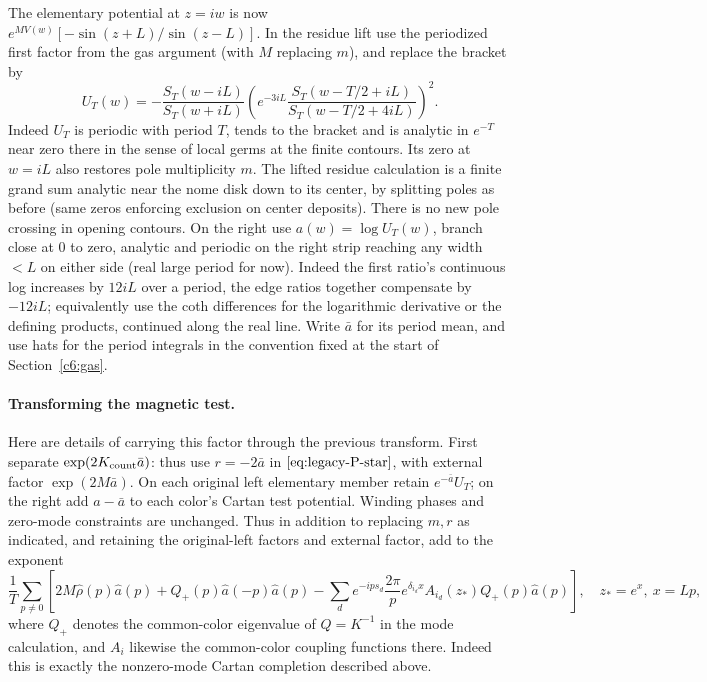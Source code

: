The elementary potential at \(z=iw\) is now \(e^{M V(w)} [-\sin(z+L)/\sin(z-L)]\). In the residue lift use the periodized first factor from the gas argument (with \(M\) replacing \(m\)), and replace the bracket by
\[
 U_T(w)=-\frac{S_T(w-iL)}{S_T(w+iL)}
   \left(e^{-3iL}\frac{S_T(w-T/2+iL)}{S_T(w-T/2+4iL)}\right)^2 .
\]
Indeed \(U_T\) is periodic with period \(T\), tends to the bracket and is analytic in \(e^{-T}\) near zero there in the sense of local germs at the finite contours. Its zero at \(w=iL\) also restores pole multiplicity \(m\). The lifted residue calculation is a finite grand sum analytic near the nome disk down to its center, by splitting poles as before (same zeros enforcing exclusion on center deposits). There is no new pole crossing in opening contours. On the right use \(a(w)=\log U_T(w)\), branch close at 0 to zero, analytic and periodic on the right strip reaching any width \(<L\) on either side (real large period for now). Indeed the first ratio's continuous log increases by \(12iL\) over a period, the edge ratios together compensate by \(-12iL\); equivalently use the coth differences for the logarithmic derivative or the defining products, continued along the real line. Write \(\bar a\) for its period mean, and use hats for the period integrals in the convention fixed at the start of Section~\ref{c6:gas}.

\paragraph{Transforming the magnetic test.}
Here are details of carrying this factor through the previous transform. First separate \(\exp\allowbreak(2K_{\rm count}\bar a)\): thus use \(r=-2\bar a\) in \(\eqref{eq:legacy-P-star}\), with external factor \(\exp(2M\bar a)\). On each original left elementary member retain \(e^{-\bar a}U_T\); on the right add \(a-\bar a\) to each color's Cartan test potential. Winding phases and zero-mode constraints are unchanged. Thus in addition to replacing \(m,r\) as indicated, and retaining the original-left factors and external factor, add to the exponent
\[
 \frac1T\sum_{p\ne0}
 \left[2M\widehat\rho(p)\widehat a(p)+Q_+(p)\widehat a(-p)\widehat a(p)
 -\sum_{d} e^{-ip s_d}\frac{2\pi}{p}e^{\delta_{i_d} x} A_{i_d}(z_*) Q_+(p)\widehat a(p)\right],
 \quad z_*=e^x,\ x=Lp ,
\]
where \(Q_+\) denotes the common-color eigenvalue of \(Q=K^{-1}\) in the mode calculation, and \(A_i\) likewise the common-color coupling functions there. Indeed this is exactly the nonzero-mode Cartan completion described above.


